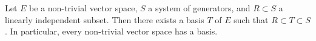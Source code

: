Let $E$ be a non-trivial vector space, $S$ a system of generators, and $R \subset S$ a linearly independent subset. Then there exists a basis $T$ of $E$ such that $R \subset T \subset S$. In particular, every non-trivial vector space has a basis.
